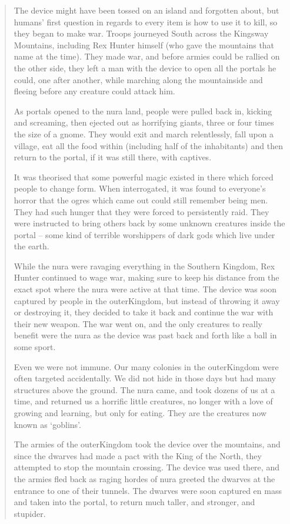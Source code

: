 \begin{multicols}{2}
\begin{quotation}
  The device might have been tossed on an island and forgotten about, but humans' first question in regards to every item is how to use it to kill, so they began to make war.
  Troops journeyed South across the Kingsway Mountains, including Rex Hunter himself (who gave the mountains that name at the time).
  They made war, and before armies could be rallied on the other side, they left a man with the device to open all the portals he could, one after another, while marching along the mountainside and fleeing before any creature could attack him.

  As portals opened to the nura land, people were pulled back in, kicking and screaming, then ejected out as horrifying giants, three or four times the size of a gnome.
  They would exit and march relentlessly, fall upon a village, eat all the food within (including half of the inhabitants) and then return to the portal, if it was still there, with captives.

  It was theorised that some powerful magic existed in there which forced people to change form.
  When interrogated, it was found to everyone's horror that the ogres which came out could still remember being men.
  They had such hunger that they were forced to persistently raid.
  They were instructed to bring others back by some unknown creatures inside the portal -- some kind of terrible worshippers of dark gods which live under the earth.

  While the nura were ravaging everything in the Southern Kingdom, Rex Hunter continued to wage war, making sure to keep his distance from the exact spot where the nura were active at that time.
  The device was soon captured by people in the \gls{outerKingdom}, but instead of throwing it away or destroying it, they decided to take it back and continue the war with their new weapon.
  The war went on, and the only creatures to really benefit were the nura as the device was past back and forth like a ball in some sport.

  Even we were not immune.
  Our many colonies in the \gls{outerKingdom} were often targeted accidentally.
  We did not hide in those days but had many structures above the ground.
  The nura came, and took dozens of us at a time, and returned us a horrific little creatures, no longer with a love of growing and learning, but only for eating.
  They are the creatures now known as `goblins'.

  The armies of the \gls{outerKingdom} took the device over the mountains, and since the dwarves had made a pact with the King of the North, they attempted to stop the mountain crossing.
  The device was used there, and the armies fled back as raging hordes of nura greeted the dwarves at the entrance to one of their tunnels.
  The dwarves were soon captured en mass and taken into the portal, to return much taller, and stronger, and stupider.


\end{quotation}
\end{multicols}

